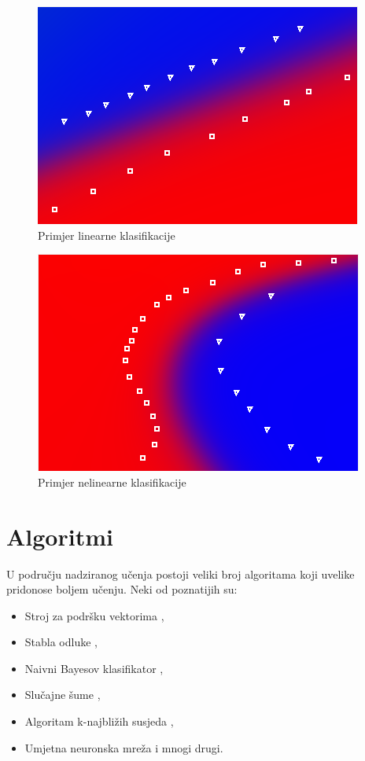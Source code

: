 \documentclass[times, utf8, zavrsni]{fer}
\begin{document}
\begin{figure}[H]
    \centering
    \includegraphics[scale=0.8]{img/linear-classification.png}
    \caption[Caption for LOF]{Primjer linearne klasifikacije\footnotemark}
    \label{fig:linear-classification}
\end{figure}

\begin{figure}[H]
    \centering
    \includegraphics[scale=0.8]{img/non-linear-classification.png}
    \caption[Caption for LOF]{Primjer nelinearne klasifikacije\footnotemark}
    \label{fig:non-linear-classification}
\end{figure}

\section{Algoritmi}
U području nadziranog učenja postoji veliki broj algoritama koji uvelike pridonose boljem učenju. Neki od poznatijih su:

\begin{itemize}
    \item Stroj za podršku vektorima ,
    \item Stabla odluke ,
    \item Naivni Bayesov klasifikator ,
    \item Slučajne šume ,
    \item Algoritam k-najbližih susjeda ,
    \item Umjetna neuronska mreža  i mnogi drugi.
\end{itemize}
\end{document}
